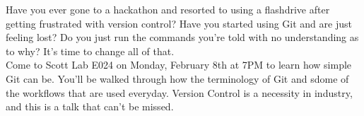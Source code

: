 \documentclass[12pt]{article}
\begin{document}
	\maketitle
	Have you ever gone to a hackathon and resorted to using a flashdrive after getting frustrated with version control? Have you started using Git and are just feeling lost? Do you just run the commands you're told with no understanding as to why? It's time to change all of that.\\
	\linebreak
	Come to Scott Lab E024 on Monday, February 8th at 7PM to learn how simple Git can be. You'll be walked through how the terminology of Git and sdome of the workflows that are used everyday. Version Control is a necessity in industry, and this is a talk that can't be missed.\\
\end{document}
